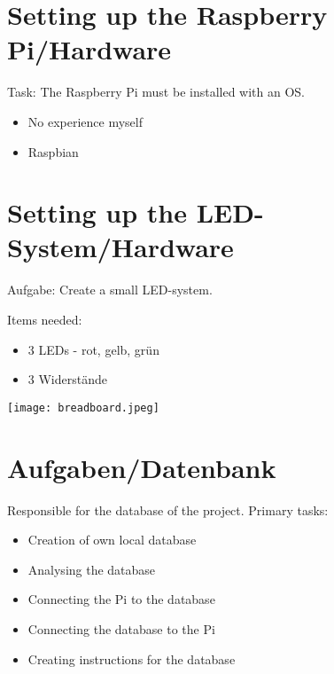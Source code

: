\documentclass[ignorenonframetext, 11pt, table]{beamer}
\begin{document}
\section*{Setting up the Raspberry Pi/Hardware}
\begin{frame}
Task: The Raspberry Pi must be installed with an OS. \pause
\begin{itemize}
\item No experience myself \pause
\item Raspbian
\end{itemize}
\end{frame}

\section*{Setting up the LED-System/Hardware}
\begin{frame}
Aufgabe: Create a small LED-system.\newline \pause

Items needed:  \pause
\begin{itemize}
\item 3 LEDs - rot, gelb, grün \pause
\item 3 Widerstände
\end{itemize}
\end{frame}
\begin{frame}
\begin{center}
\texttt{[image: breadboard.jpeg]}
\end{center}
\end{frame}

\section*{Aufgaben/Datenbank}
\begin{frame}
Responsible for the database of the project. \newline\newline\pause
Primary tasks:\pause
\begin{itemize}
\item Creation of own local database \pause
\item Analysing the database\pause
\item Connecting the Pi to the database\pause
\item Connecting the database to the Pi\pause
\item Creating instructions for the database
\end{itemize}
\end{frame}
\end{document}
